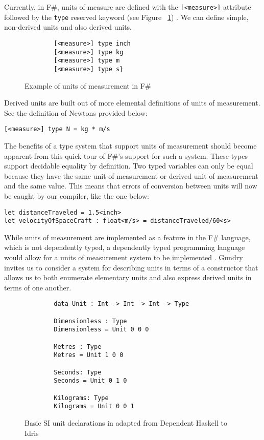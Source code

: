 Currently, in F\#, units of measure are defined with the \texttt{[<measure>]}
attribute followed by the \texttt{type} reserved keyword (see Figure
~\ref{units_in_f_sharp}) \cite{f_sharp_units}. We can define simple, non-derived
units and also derived units. 

\begin{figure}
    \caption{Example of units of measurement in F\#}
    \label{units_in_f_sharp}
    \begin{lstlisting}
        [<measure>] type inch
        [<measure>] type kg
        [<measure>] type m
        [<measure>] type s}
    \end{lstlisting}
\end{figure}

Derived units are built out of more elemental definitions of units of measurement. See the definition of Newtons provided below: 

\texttt{[<measure>] type N = kg * m/s}

The benefits of a type system that support units of measurement should become
apparent from this quick tour of F\#'s support for such a system. These types
support decidable equality by definition. Two typed variables can only be equal
because they have the same unit of measurement or derived unit of measurement
and the same value. This means that errors of conversion between units will now
be caught by our compiler, like the one below: 

\texttt{let distanceTraveled = 1.5<inch>}\\
\texttt{let velocityOfSpaceCraft : float<m/s> = distanceTraveled/60<s>}

While units of measurement are implemented as a feature in the F\# language,
which is not dependently typed, a dependently typed programming language would
allow for a units of measurement system to be implemented \cite{gundry2013}. Gundry invites us to consider a system for describing units in terms of a constructor that allows us to both enumerate elementary units and also express derived units in terms of one another. 

\begin{figure}[h]
    \caption{Basic SI unit declarations in adapted from Dependent Haskell to Idris \cite{gundry2013}}
    \begin{lstlisting}
        data Unit : Int -> Int -> Int -> Type
        
        Dimensionless : Type
        Dimensionless = Unit 0 0 0
        
        Metres : Type
        Metres = Unit 1 0 0
        
        Seconds: Type
        Seconds = Unit 0 1 0
        
        Kilograms: Type
        Kilograms = Unit 0 0 1
    \end{lstlisting}
\end{figure}

